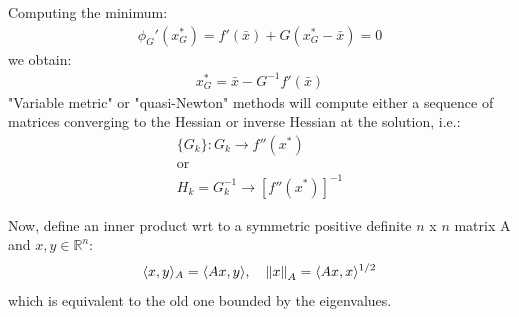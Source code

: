 \documentclass[12pt,a4paper]{article}
\begin{document}
	Computing the minimum:
	\begin{align*}
		\phi_G'(x_G^*) = f'(\bar{x}) + G(x_G^* - \bar{x}) = 0
	\end{align*}
	we obtain:
	\begin{align*}
		x_G^* = \bar{x} - G^{-1}f'(\bar{x})
	\end{align*}
	"Variable metric" or "quasi-Newton" methods will compute either a sequence of matrices converging to the Hessian or inverse Hessian at the solution, i.e.:
	\begin{align*}
		\{G_k\}: G_k \rightarrow f''(x^*) \\ \text{or} \\
		H_k = G_k^{-1} \rightarrow [f''(x^*)]^{-1}
	\end{align*}
	
	Now, define an inner product wrt to a symmetric positive definite $n$ x $n$ matrix A and $x,y \in \mathbb{R}^n$:
	\begin{align*}
		\langle x, y \rangle_A = \langle Ax, y \rangle, \hspace{10pt} \norm{x}_A = \langle Ax, x \rangle^{1/2}
	\end{align*} 
	which is equivalent to the old one bounded by the eigenvalues. 
	
\end{document}
